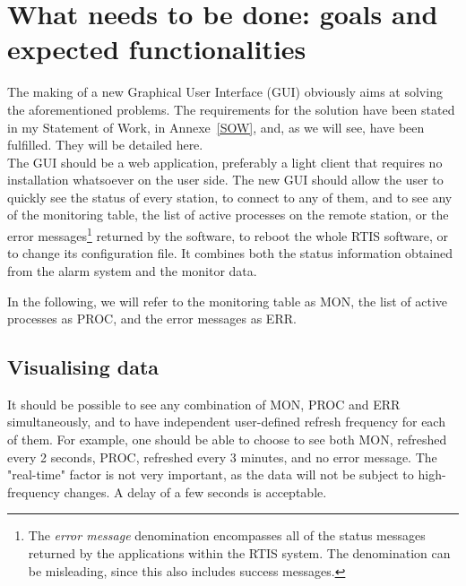 \documentclass{themeensg}
\begin{document}

\section{What needs to be done: goals and expected functionalities}

The making of a new Graphical User Interface (GUI) obviously aims at solving the aforementioned problems. The requirements for the solution  have been stated in my Statement of Work, in Annexe~\ref{SOW}, and, as we will see, have been fulfilled. They will be detailed here. \\


The GUI should be a web application, preferably a light client that requires no installation whatsoever on the user side. The new GUI should allow the user to quickly see the status of every station, to connect to any of them, and to see any of the monitoring table, the list of active processes on the remote station, or the error messages\footnote{The \textit{error message} denomination encompasses all of the status messages returned by the applications within the RTIS system. The denomination can be misleading, since this also includes success messages.} returned by the software, to reboot the whole RTIS software, or to change its configuration file. It combines both the status information obtained from the alarm system and the monitor data. 

In the following, we will refer to the monitoring table as MON, the list of active processes as PROC, and the error messages as ERR.\\

\subsection{Visualising data}

It should be possible to see any combination of MON, PROC and ERR simultaneously, and to have independent user-defined refresh frequency for each of them. For example, one should be able to choose to see both MON, refreshed every 2 seconds, PROC, refreshed every 3 minutes, and no error message. The "real-time" factor is not very important, as the data will not be subject to high-frequency changes. A delay of a few seconds is acceptable.\\
\end{document}
